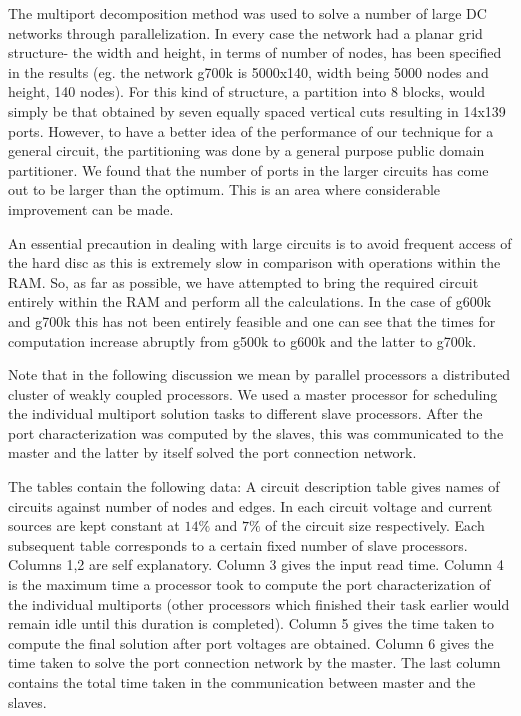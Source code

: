 \documentclass[10pt,psfig,letterpaper,twocolumn]{article}
\begin{document}
The multiport decomposition method was used to solve a number of large DC
networks through parallelization. In every case the network had a planar grid structure-
the width and height, in terms of number of nodes, has been specified in the
results (eg. the network g700k is 5000x140, width being 5000 nodes and 
height, 140 nodes). 
For this kind of structure, a partition into 8 blocks, 
would simply be that obtained by seven equally spaced vertical cuts resulting in 14x139 ports. 
However, to have a better idea of the performance of our technique
for a general circuit, the  partitioning was done by a general purpose
public domain partitioner. We found that the number of ports in the larger
circuits has come out to be larger than the optimum. This is an area where
considerable improvement can be made.\par
An essential precaution in dealing with large circuits is to avoid frequent access of
the hard disc as this is extremely slow in comparison with operations within the RAM.
So, as far as possible, we have attempted to bring the required circuit entirely
within the RAM and perform all the calculations. In the case of g600k and g700k this has 
not been entirely feasible and one can see that the times for computation increase
abruptly from g500k to g600k and the latter to g700k.

Note that in the following discussion we mean by parallel processors a distributed cluster of
weakly coupled processors. 
We used a master processor for scheduling the individual multiport
solution tasks to different slave processors. After the port characterization
was computed by the slaves, this was communicated to the master and the latter
by itself solved the port connection network.\par

The tables contain the following data:
A circuit description table gives names of circuits against number of nodes and edges.
In each circuit voltage and current sources are kept constant at
$14\%$ and $7\%$ of the circuit size respectively.
Each subsequent table corresponds to a certain fixed number of slave processors.
Columns 1,2 are self explanatory. Column 3 gives the input read time. Column 4 is the maximum time 
a processor took to compute the port characterization of the
individual multiports (other processors which finished 
their task earlier would remain idle until this duration is completed).
Column 5 gives the time taken to compute the final solution
after port voltages are obtained. 
Column 6 gives the time taken to solve the port connection   
network by the master.
The last column contains the total time taken in the communication
between master and the slaves.\par
\end{document}

